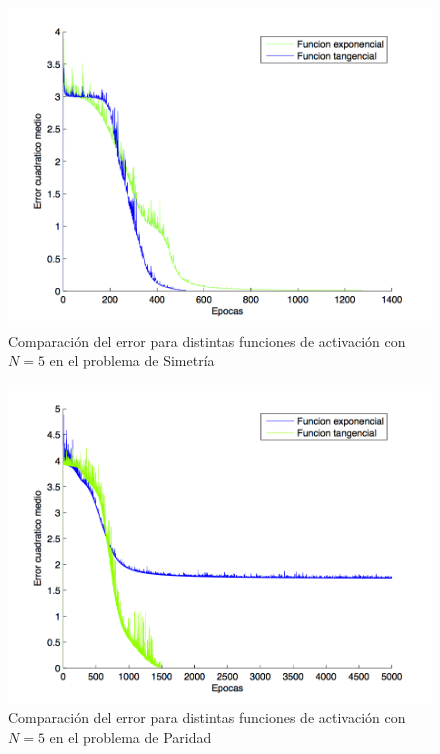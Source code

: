 \documentclass{sig-alternate}
\begin{document}
\newpage

\begin{figure}[!ht]
	\includegraphics[scale=0.5]{./images/tanhVsExp.png}
  \caption{Comparaci\'on del error para distintas funciones de activaci\'on con $N = 5$ en el problema de Simetr\'ia}
  \label{fig:symN5}
\end{figure}

\begin{figure}[!ht]
	\includegraphics[scale=0.5]{./images/tanhVsExpParity.png}
  \caption{Comparaci\'on del error para distintas funciones de activaci\'on con $N = 5$ en el problema de Paridad}
  \label{fig:parN5}
\end{figure}
\end{document}
